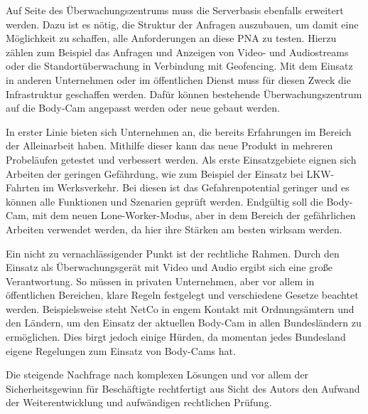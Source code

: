 \documentclass[thesis.tex]{subfiles}
\begin{document}
Auf Seite des Überwachungszentrums muss die Serverbasis ebenfalls erweitert werden.
Dazu ist es nötig, die Struktur der Anfragen auszubauen, um damit eine Möglichkeit zu schaffen, alle Anforderungen an diese PNA zu testen.
Hierzu zählen zum Beispiel das Anfragen und Anzeigen von Video- und Audiostreams oder die Standortüberwachung in Verbindung mit Geofencing.
Mit dem Einsatz in anderen Unternehmen oder im öffentlichen Dienst muss für diesen Zweck die Infrastruktur geschaffen werden.
Dafür können bestehende Überwachungszentrum auf die Body-Cam angepasst werden oder neue gebaut werden.

In erster Linie bieten sich Unternehmen an, die bereits Erfahrungen im Bereich der Alleinarbeit haben.
Mithilfe dieser kann das neue Produkt in mehreren Probeläufen getestet und verbessert werden.
Als erste Einsatzgebiete eignen sich Arbeiten der geringen Gefährdung, wie zum Beispiel der Einsatz bei LKW-Fahrten im Werksverkehr.
Bei diesen ist das Gefahrenpotential geringer und es können alle Funktionen und Szenarien geprüft werden.
Endgültig soll die Body-Cam, mit dem neuen Lone-Worker-Modus, aber in dem Bereich der \glqq gefährlichen Arbeiten\grqq{} verwendet werden, da hier ihre Stärken am besten wirksam werden.

Ein nicht zu vernachlässigender Punkt ist der rechtliche Rahmen.
Durch den Einsatz als Überwachungsgerät mit Video und Audio ergibt sich eine große Verantwortung.
So müssen in privaten Unternehmen, aber vor allem in öffentlichen Bereichen, klare Regeln festgelegt und verschiedene Gesetze beachtet werden.
Beispielsweise steht NetCo in engem Kontakt mit Ordnungsämtern und den Ländern, um den Einsatz der aktuellen Body-Cam in allen Bundesländern zu ermöglichen.
Dies birgt jedoch einige Hürden, da momentan jedes Bundesland eigene Regelungen zum Einsatz von Body-Cams hat.

Die steigende Nachfrage nach komplexen Lösungen und vor allem der Sicherheitsgewinn für Beschäftigte rechtfertigt aus Sicht des Autors den Aufwand der Weiterentwicklung und aufwändigen rechtlichen Prüfung.


\subfilebib %
\end{document}
